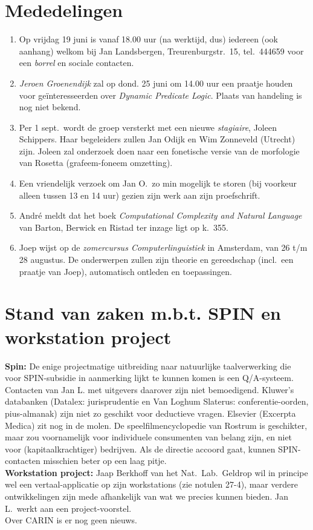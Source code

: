 \section{Mededelingen}
\begin{enumerate}
\item Op vrijdag 19 juni is vanaf 18.00 uur (na werktijd, dus) 
iedereen (ook aanhang) welkom bij Jan Landsbergen, Treurenburgstr.\ 
15, tel.\ 444659 voor een {\em borrel} en sociale contacten.
\item {\em Jeroen Groenendijk} zal op dond. 25 juni om 14.00 uur een praatje 
houden voor ge\"{i}nteresseerden over {\em Dynamic Predicate Logic}. Plaats van 
handeling is nog niet bekend.
\item Per 1 sept.\ wordt de groep versterkt met een nieuwe {\em stagiaire}, 
Joleen Schippers. Haar begeleiders zullen Jan Odijk en Wim Zonneveld (Utrecht) 
zijn. Joleen zal onderzoek doen naar een fonetische versie van de morfologie 
van Rosetta (grafeem-foneem omzetting).
\item Een vriendelijk verzoek om Jan O.\ zo min mogelijk te storen (bij 
voorkeur alleen tussen 13 en 14 uur) gezien zijn werk aan zijn proefschrift.
\item Andr\'{e} meldt dat het boek {\em Computational Complexity and Natural 
Language} van Barton, Berwick en Ristad ter inzage ligt op k.\ 355.
\item Joep wijst op de {\em zomercursus Computerlinguistiek} in Amsterdam, van 
26 t/m 28 augustus. De onderwerpen zullen zijn theorie en gereedschap (incl.\ 
een praatje van Joep), automatisch ontleden en toepassingen.
\end{enumerate}

\section{Stand van zaken m.b.t. SPIN en workstation project}
{\bf Spin:} De enige projectmatige uitbreiding naar natuurlijke taalverwerking
die voor SPIN-subsidie in aanmerking lijkt te kunnen komen is een Q/A-systeem.
Contacten van Jan L. met uitgevers daarover zijn niet bemoedigend. Kluwer's
databanken (Datalex: jurisprudentie en Van Loghum Slaterus: conferentie-oorden, 
pius-almanak) zijn niet zo geschikt voor deductieve vragen. Elsevier (Excerpta 
Medica) zit nog in de molen. De speelfilmencyclopedie van Rostrum is 
geschikter, maar zou voornamelijk voor individuele consumenten van belang zijn, 
en niet voor (kapitaalkrachtiger) be\-drijven. Als de directie accoord gaat, 
kunnen SPIN-contacten misschien beter op een laag pitje.\\
{\bf Workstation project:} Jaap Berkhoff van het Nat.\ Lab.\ Geldrop wil in 
principe wel een vertaal-applicatie op zijn workstations (zie notulen 27-4),
maar verdere ontwikkelingen zijn mede 
afhankelijk van wat we precies kunnen bieden. Jan L.\ werkt aan een
project-voorstel. \\
Over CARIN is er nog geen nieuws.

